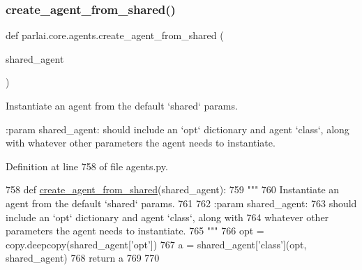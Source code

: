\mbox{\label{namespaceparlai_1_1core_1_1agents_aa5af5dd1d2f9da491b60348d479b849f}} 
\subsubsection{\texorpdfstring{create\+\_\+agent\+\_\+from\+\_\+shared()}{create\_agent\_from\_shared()}}
{\footnotesize\ttfamily def parlai.\+core.\+agents.\+create\+\_\+agent\+\_\+from\+\_\+shared (\begin{DoxyParamCaption}\item[{}]{shared\+\_\+agent }\end{DoxyParamCaption})}

\begin{DoxyVerb}Instantiate an agent from the default `shared` params.

:param shared_agent:
    should include an `opt` dictionary and agent `class`, along with
    whatever other parameters the agent needs to instantiate.
\end{DoxyVerb}
 

Definition at line 758 of file agents.\+py.


\begin{DoxyCode}
758 \textcolor{keyword}{def }\hyperlink{namespaceparlai_1_1core_1_1agents_aa5af5dd1d2f9da491b60348d479b849f}{create\_agent\_from\_shared}(shared\_agent):
759     \textcolor{stringliteral}{"""}
760 \textcolor{stringliteral}{    Instantiate an agent from the default `shared` params.}
761 \textcolor{stringliteral}{}
762 \textcolor{stringliteral}{    :param shared\_agent:}
763 \textcolor{stringliteral}{        should include an `opt` dictionary and agent `class`, along with}
764 \textcolor{stringliteral}{        whatever other parameters the agent needs to instantiate.}
765 \textcolor{stringliteral}{    """}
766     opt = copy.deepcopy(shared\_agent[\textcolor{stringliteral}{'opt'}])
767     a = shared\_agent[\textcolor{stringliteral}{'class'}](opt, shared\_agent)
768     \textcolor{keywordflow}{return} a
769 
770 
\end{DoxyCode}
\mbox{\label{namespaceparlai_1_1core_1_1agents_a5600530545f5e60a79e2d657b5af1d8c}} 
